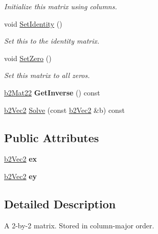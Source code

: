 \begin{DoxyCompactItemize}
\begin{DoxyCompactList}\small\item\em Initialize this matrix using columns. \end{DoxyCompactList}\item 
\mbox{\label{structb2_mat22_a7192f063b771ac9ded060e41df890509}} 
void \hyperlink{structb2_mat22_a7192f063b771ac9ded060e41df890509}{Set\+Identity} ()
\begin{DoxyCompactList}\small\item\em Set this to the identity matrix. \end{DoxyCompactList}\item 
\mbox{\label{structb2_mat22_aaeae95f61cf3171ffb94703980e3594b}} 
void \hyperlink{structb2_mat22_aaeae95f61cf3171ffb94703980e3594b}{Set\+Zero} ()
\begin{DoxyCompactList}\small\item\em Set this matrix to all zeros. \end{DoxyCompactList}\item 
\mbox{\label{structb2_mat22_ad0b0676deea081b761c67be48e0ac850}} 
\hyperlink{structb2_mat22}{b2\+Mat22} {\bfseries Get\+Inverse} () const
\item 
\hyperlink{structb2_vec2}{b2\+Vec2} \hyperlink{structb2_mat22_a3313c8d135c01fbf74e7fea31f1ea4c1}{Solve} (const \hyperlink{structb2_vec2}{b2\+Vec2} \&b) const
\end{DoxyCompactItemize}
\subsection*{Public Attributes}
\begin{DoxyCompactItemize}
\item 
\mbox{\label{structb2_mat22_abaffa5fc1d401ea36415acffa6205689}} 
\hyperlink{structb2_vec2}{b2\+Vec2} {\bfseries ex}
\item 
\mbox{\label{structb2_mat22_af19db58941d2cd146325ef3191b776fd}} 
\hyperlink{structb2_vec2}{b2\+Vec2} {\bfseries ey}
\end{DoxyCompactItemize}


\subsection{Detailed Description}
A 2-\/by-\/2 matrix. Stored in column-\/major order. 

